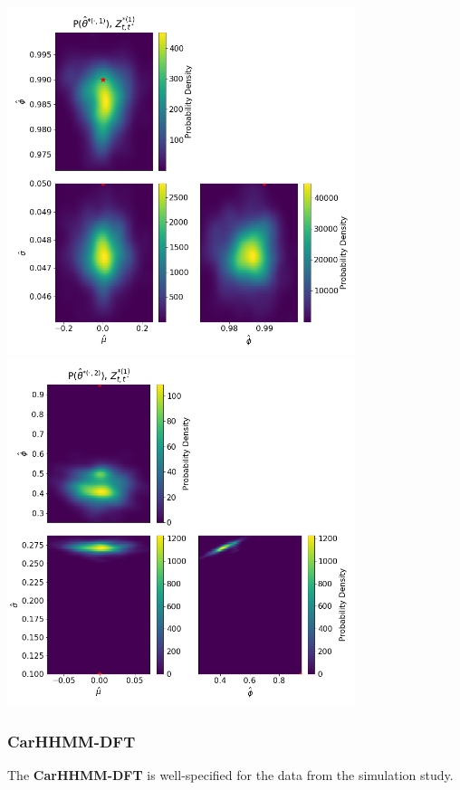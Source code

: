 \documentclass[12pt]{TD-CJS}
\begin{document}
\includegraphics[height=4in]{../Plots/hhmm_V_MLE_density_A_0_0.png}
\includegraphics[height=4in]{../Plots/hhmm_V_MLE_density_A_0_1.png}


\newpage
\subsubsection{\textbf{CarHHMM-DFT}}

The \textbf{CarHHMM-DFT} is well-specified for the data from the simulation study. 
\end{document}
